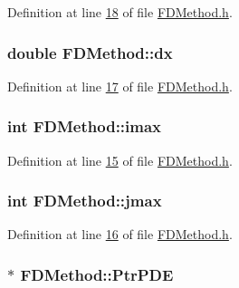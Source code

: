 Definition at line \hyperlink{FDMethod_8h_source_l00018}{18} of file \hyperlink{FDMethod_8h_source}{F\+D\+Method.\+h}.

\hypertarget{classFDMethod_aec2698863360e900a8d84f7d672484c9}{
\subsubsection[{dx}]{\setlength{\rightskip}{0pt plus 5cm}double F\+D\+Method\+::dx}}\label{classFDMethod_aec2698863360e900a8d84f7d672484c9}


Definition at line \hyperlink{FDMethod_8h_source_l00017}{17} of file \hyperlink{FDMethod_8h_source}{F\+D\+Method.\+h}.

\hypertarget{classFDMethod_a72f22ed3e70c7f6084d3499fa7fbad38}{
\subsubsection[{imax}]{\setlength{\rightskip}{0pt plus 5cm}int F\+D\+Method\+::imax}}\label{classFDMethod_a72f22ed3e70c7f6084d3499fa7fbad38}


Definition at line \hyperlink{FDMethod_8h_source_l00015}{15} of file \hyperlink{FDMethod_8h_source}{F\+D\+Method.\+h}.

\hypertarget{classFDMethod_a6d4cec47464758c00c5d65cfa676d518}{
\subsubsection[{jmax}]{\setlength{\rightskip}{0pt plus 5cm}int F\+D\+Method\+::jmax}}\label{classFDMethod_a6d4cec47464758c00c5d65cfa676d518}


Definition at line \hyperlink{FDMethod_8h_source_l00016}{16} of file \hyperlink{FDMethod_8h_source}{F\+D\+Method.\+h}.

\hypertarget{classFDMethod_a900e2425569c70cf67c0b89fbeb15aba}{
\subsubsection[{Ptr\+P\+D\+E}]{$\ast$ F\+D\+Method\+::\+Ptr\+P\+D\+E}}\label{classFDMethod_a900e2425569c70cf67c0b89fbeb15aba}


